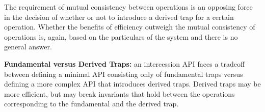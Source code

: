\documentclass{sig-alternate}
\begin{document}
The requirement of mutual consistency between operations is an opposing force in the decision of whether or not to introduce a derived trap for a certain operation. Whether the benefits of efficiency outweigh the mutual consistency of operations is, again, based on the particulars of the system and there is no general answer.

\textbf{Fundamental versus Derived Traps:} an intercession API faces a tradeoff between defining a minimal API consisting only of fundamental traps versus defining a more complex API that introduces derived traps. Derived traps may be more efficient, but may break invariants that hold between the operations corresponding to the fundamental and the derived trap.





\end{document}
